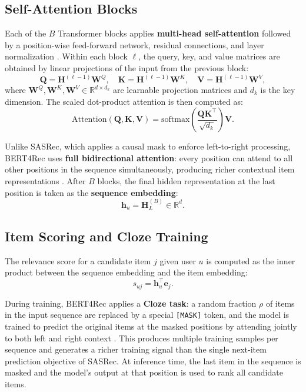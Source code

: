 \documentclass[12pt,a4paper]{report}
\newcommand{\parencite}[1]{\citep{#1}}
\begin{document}
\subsection{Self-Attention Blocks}

Each of the $B$ Transformer blocks applies \textbf{multi-head
self-attention} followed by a position-wise feed-forward network,
residual connections, and layer normalization
\parencite{vaswani2017attention}. Within each block $\ell$, the
query, key, and value matrices are obtained by linear projections
of the input from the previous block:
\begin{equation}
  \mathbf{Q} = \mathbf{H}^{(\ell-1)} \mathbf{W}^Q, \quad
  \mathbf{K} = \mathbf{H}^{(\ell-1)} \mathbf{W}^K, \quad
  \mathbf{V} = \mathbf{H}^{(\ell-1)} \mathbf{W}^V,
\end{equation}
where $\mathbf{W}^Q, \mathbf{W}^K, \mathbf{W}^V \in
\mathbb{R}^{d \times d_k}$ are learnable projection matrices and
$d_k$ is the key dimension. The scaled dot-product attention is
then computed as:
\begin{equation}
  \text{Attention}(\mathbf{Q}, \mathbf{K}, \mathbf{V}) =
    \text{softmax}\!\left(
      \frac{\mathbf{Q} \mathbf{K}^\top}{\sqrt{d_k}}
    \right) \mathbf{V}.
\end{equation}

Unlike SASRec, which applies a causal mask to enforce
left-to-right processing, BERT4Rec uses \textbf{full bidirectional
attention}: every position can attend to all other positions in
the sequence simultaneously, producing richer contextual item
representations \parencite{sun2019bert4rec}. After $B$ blocks,
the final hidden representation at the last position is taken as
the \textbf{sequence embedding}:
\begin{equation}
  \mathbf{h}_u = \mathbf{H}_L^{(B)} \in \mathbb{R}^d.
\end{equation}

\subsection{Item Scoring and Cloze Training}

The relevance score for a candidate item $j$ given user $u$ is
computed as the inner product between the sequence embedding and
the item embedding:
\begin{equation}
  s_{uj} = \mathbf{h}_u^\top \mathbf{e}_j.
\end{equation}

During training, BERT4Rec applies a \textbf{Cloze task}: a random
fraction $\rho$ of items in the input sequence are replaced by a
special \texttt{[MASK]} token, and the model is trained to
predict the original items at the masked positions by attending
jointly to both left and right context \parencite{sun2019bert4rec}.
This produces multiple training samples per sequence and generates
a richer training signal than the single next-item prediction
objective of SASRec. At inference time, the last item in the
sequence is masked and the model's output at that position is
used to rank all candidate items.
\end{document}
